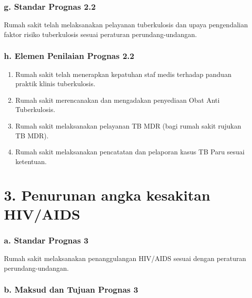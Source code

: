 \documentclass[
]{book}
\providecommand{\tightlist}{%
  \setlength{\itemsep}{0pt}\setlength{\parskip}{0pt}}
\begin{document}
\hypertarget{g.-standar-prognas-2.2}{%
\subsubsection*{g. Standar Prognas 2.2}\label{g.-standar-prognas-2.2}}

Rumah sakit telah melaksanakan pelayanan tuberkulosis dan upaya pengendalian faktor risiko tuberkulosis sesuai peraturan perundang-undangan.

\hypertarget{h.-elemen-penilaian-prognas-2.2}{%
\subsubsection*{h. Elemen Penilaian Prognas 2.2}\label{h.-elemen-penilaian-prognas-2.2}}

\begin{enumerate}
\def\labelenumi{\arabic{enumi}.}
\tightlist
\item
  Rumah sakit telah menerapkan kepatuhan staf medis terhadap panduan praktik klinis tuberkulosis.
\item
  Rumah sakit merencanakan dan mengadakan penyediaan Obat Anti Tuberkulosis.
\item
  Rumah sakit melaksanakan pelayanan TB MDR (bagi rumah sakit rujukan TB MDR).
\item
  Rumah sakit melaksanakan pencatatan dan pelaporan kasus TB Paru sesuai ketentuan.
\end{enumerate}

\hypertarget{penurunan-angka-kesakitan-hivaids}{%
\section*{3. Penurunan angka kesakitan HIV/AIDS}\label{penurunan-angka-kesakitan-hivaids}}

\hypertarget{a.-standar-prognas-3}{%
\subsubsection*{a. Standar Prognas 3}\label{a.-standar-prognas-3}}

Rumah sakit melaksanakan penanggulangan HIV/AIDS sesuai dengan peraturan perundang-undangan.

\hypertarget{b.-maksud-dan-tujuan-prognas-3}{%
\subsubsection*{b. Maksud dan Tujuan Prognas 3}\label{b.-maksud-dan-tujuan-prognas-3}}
\end{document}
